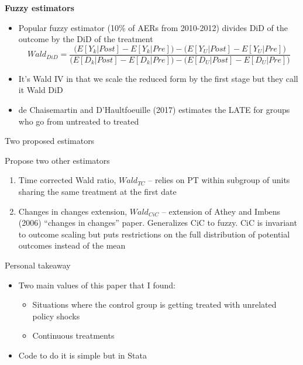 \documentclass{beamer}
\begin{document}
\begin{frame}[shrink=10,plain]
\begin{center}
\textbf{Fuzzy estimators}
\end{center}

\begin{itemize}
\item Popular fuzzy estimator (10\% of AERs from 2010-2012) divides DiD of the outcome by the DiD of the treatment 
$$ Wald_{DiD} =  \frac{ 
\bigg (
E[Y_k|Post] - E[Y_k|Pre] \bigg ) - 
\bigg ( E[Y_U|Post] - E[Y_U|Pre] \bigg)
 }
 { \bigg ( 
 E[D_k|Post] - E[D_k|Pre] \bigg) - 
 \bigg ( E[D_U | Post] - E[D_U | Pre] \bigg )} 
$$
\item It's Wald IV in that we scale the reduced form by the first stage but they call it Wald DiD
\item de Chaisemartin and D'Haultfoeuille (2017) estimates the LATE for groups who go from untreated to treated
\end{itemize}

\end{frame}

\begin{frame}{Two proposed estimators}

 Propose two other estimators

	\begin{enumerate}
	\item Time corrected Wald ratio, $Wald_{TC}$ -- relies on PT within subgroup of units sharing the same treatment at the first date
	\item Changes in changes extension, $Wald_{CiC}$ -- extension of Athey and Imbens (2006) ``changes in changes'' paper. Generalizes CiC to fuzzy.  CiC is invariant to outcome scaling but puts restrictions on the full distribution of potential outcomes instead of the mean
	\end{enumerate}
	
\end{frame}

\begin{frame}{Personal takeaway}

\begin{itemize}
\item Two main values of this paper that I found:
	\begin{itemize}
	\item Situations where the control group is getting treated with unrelated policy shocks
	\item Continuous treatments
	\end{itemize}
\item Code to do it is simple but in Stata

\end{itemize}

\end{frame}
\end{document}
